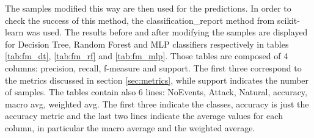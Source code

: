 The samples modified this way are then used for the predictions. In order to check the success of this method, the classification\_report method from scikit-learn was used. The results before and after modifying the samples are displayed for Decision Tree, Random Forest and MLP classifiers respectively in tables \ref{tab:fm_dt}, \ref{tab:fm_rf} and \ref{tab:fm_mlp}. Those tables are composed of 4 columns: precision, recall, f-measure and support. The first three correspond to the metrics discussed in section \ref{sec:metrics}, while support indicates the number of samples. The tables contain also 6 lines: NoEvents, Attack, Natural, accuracy, macro avg, weighted avg. The first three indicate the classes, accuracy is just the accuracy metric and the last two lines indicate the average values for each column, in particular the macro average and the weighted average.

